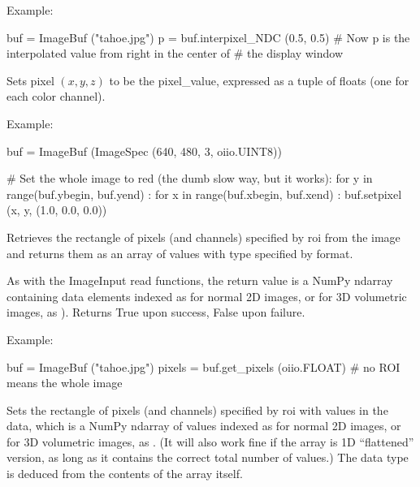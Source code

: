 \noindent Example:
\begin{code}
    buf = ImageBuf ("tahoe.jpg")
    p = buf.interpixel_NDC (0.5, 0.5)
    # Now p is the interpolated value from right in the center of
    # the display window
\end{code}
\apiend

Sets pixel $(x,y,z)$ to be the {\cf pixel_value}, expressed as a tuple of
{\cf float}s (one for each color channel).

\noindent Example:
\begin{code}
    buf = ImageBuf (ImageSpec (640, 480, 3, oiio.UINT8))

    # Set the whole image to red (the dumb slow way, but it works):
    for y in range(buf.ybegin, buf.yend) :
        for x in range(buf.xbegin, buf.xend) :
            buf.setpixel (x, y, (1.0, 0.0, 0.0))
\end{code}
\apiend


Retrieves the rectangle of pixels (and channels) specified by {\cf roi} from
the image and returns them as an array of values with type specified by
{\cf format}.

As with the {\cf ImageInput} read functions, the return value is a NumPy
{\cf ndarray} containing data elements indexed as
{\cf [y][x][channel]} for normal 2D images, or for 3D volumetric images,
as {\cf [z][y][x][channel]}).
Returns {\cf True} upon success, {\cf False} upon failure.

\noindent Example:
\begin{code}
    buf = ImageBuf ("tahoe.jpg")
    pixels = buf.get_pixels (oiio.FLOAT)  # no ROI means the whole image
\end{code}
\apiend


Sets the rectangle of pixels (and channels) specified by {\cf roi} with
values in the {\cf data}, which is a NumPy {\cf ndarray} of values
indexed as {\cf [y][x][channel]} for normal 2D images, or for 3D volumetric images,
as {\cf [z][y][x][channel]}. (It will also work fine if
the array is 1D ``flattened'' version, as long as it contains the correct
total number of values.) The data type is deduced from the contents of the
array itself.

